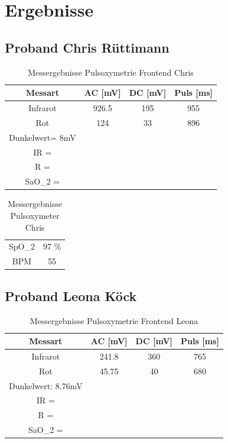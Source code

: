 \documentclass[11pt]{scrartcl}
\begin{document}
    \section{Ergebnisse}


    \subsection{Proband Chris Rüttimann}
    \begin {table} [h]
    \centering
    \caption{Messergebnisse Pulsoxymetrie Frontend Chris}
    \label{tab:chris_frontend}
    \begin{tabular}{c|c c c}
        Messart & AC [mV] & DC [mV] & Puls [ms] \\
        \hline
        Infrarot & 926.5 & 195 & 955 \\
        Rot & 124 & 33 & 896 \\
        \hline
        Dunkelwert= 8mV \\
        IR = \\
        R = \\
        SaO_{2} = 
    \end{tabular}  
    \end{table}

    \begin {table} [h]
    \centering
    \caption{Messergebnisse Pulsoxymeter Chris}
    \label{tab:chris_frontend}
    \begin{tabular}{c|c}
        SpO_{2} & 97 \%  \\
        BPM & 55 
    \end{tabular}  
    \end{table}


    \pagebreak

    \subsection{Proband Leona Köck}
    \begin {table} [h]
    \centering
    \caption{Messergebnisse Pulsoxymetrie Frontend Leona}
    \label{tab:leona_frontend}
    \begin{tabular}{c|c c c}
        Messart & AC [mV] & DC [mV] & Puls [ms] \\
        \hline
        Infrarot & 241.8 & 360 & 765 \\
        Rot & 45.75 & 40 & 680 \\
        \hline
        Dunkelwert: 8.76mV \\
        IR = \\
        R = \\
        SaO_{2} = 
    \end{tabular}  
    \end{table}
\end{document}
